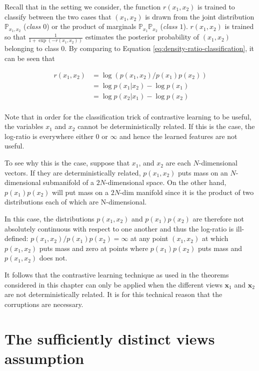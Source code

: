 Recall that in the setting we consider, the function $r(x_1, x_2)$ is trained to classify between the two cases that $(x_1, x_2)$ is drawn from the joint distribution $\mathbb{P}_{x_1, x_2}$ (\emph{class $0$}) or the product of marginals $\mathbb{P}_{x_1}\mathbb{P}_{x_2}$ (\emph{class $1$}).
$r(x_1, x_2)$ is trained so that $\frac{1}{1 + \exp(-r(x_1, x_2))}$ estimates the posterior probability of $(x_1, x_2)$ belonging to class 0.
By comparing to Equation \ref{eq:density-ratio-classification}, it can be seen that

\begin{align*}
r(x_1, x_2) &= \log \left( p(x_1, x_2) / p(x_1) p(x_2)\right) \\
&= \log p(x_1 | x_2)  - \log p(x_1) \\
&= \log p(x_2 | x_1)  - \log p(x_2) \\
\end{align*}

Note that in order for the classification trick of contrastive learning to be useful, the variables $x_1$ and $x_2$ cannot be deterministically related.
If this is the case, the log-ratio is everywhere either $0$ or $\infty$ and hence the learned features are not useful.

To see why this is the case, suppose that $x_1$, and $x_2$ are each $N$-dimensional vectors.
If they are deterministically related, $p(x_1, x_2)$ puts mass on an $N$-dimensional submanifold of a $2N$-dimensional space.
On the other hand, $p(x_1)p(x_2)$ will put mass on a $2N$-dim manifold since it is the product of two distributions each of which are N-dimensional.

In this case, the distributions $p(x_1, x_2)$ and $p(x_1)p(x_2)$ are therefore not absolutely continuous with respect to one another and thus the log-ratio is ill-defined: $p(x_1, x_2)/p(x_1)p(x_2) = \infty$ at any point $(x_1,x_2)$ at which $p(x_1, x_2)$ puts mass and zero at points where $p(x_1)p(x_2)$ puts mass and $p(x_1,x_2)$ does not.

It follows that the contrastive learning technique as used in the theorems considered in this chapter can only be applied when the different views $\bm{x}_1$ and $\bm{x}_2$ are not deterministically related.
It is for this technical reason that the corruptions are necessary.


\section{The sufficiently distinct views assumption}
\label{appendix:sdv}

